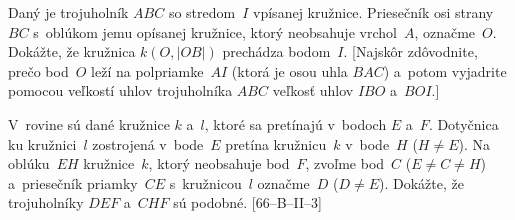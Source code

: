 {\D
Daný je trojuholník $ABC$ so stredom~$I$ vpísanej kružnice.
Priesečník osi strany~$BC$ s~oblúkom jemu opísanej kružnice, ktorý
neobsahuje vrchol~$A$, označme~$O$.
Dokážte, že kružnica $k(O, |OB|)$ prechádza bodom~$I$. [Najskôr
zdôvodnite, prečo bod~$O$ leží na polpriamke~$AI$ (ktorá je osou uhla
$BAC$) a~potom vyjadrite pomocou veľkostí uhlov trojuholníka $ABC$
veľkosť uhlov $IBO$ a~$BOI$.]

V~rovine sú dané kružnice $k$ a~$l$, ktoré sa pretínajú v~bodoch
$E$ a~$F$. Dotyčnica ku kružnici~$l$ zostrojená v~bode~$E$ pretína kružnicu~$k$
v~bode~$H$ ($H\ne E$). Na oblúku~$EH$ kružnice~$k$, ktorý neobsahuje bod~$F$,
zvoľme bod~$C$ ($E\ne C\ne H$) a~priesečník priamky~$CE$ s~kružnicou~$l$
označme~$D$ ($D\ne E$). Dokážte, že trojuholníky $DEF$ a~$CHF$ sú podobné.
[66--B--II--3]
}

